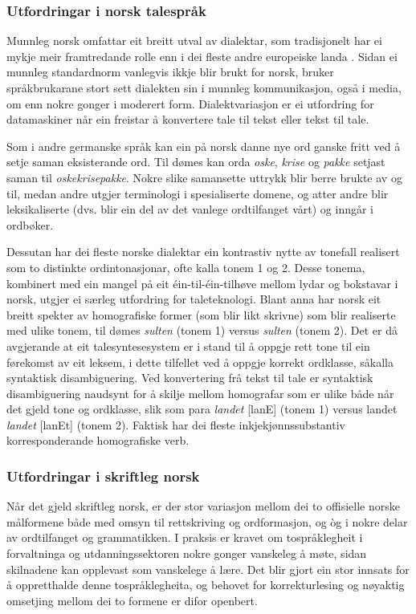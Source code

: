 \begin{multicols}{2}
\subsubsection{Utfordringar i norsk talespråk}
Munnleg norsk omfattar eit breitt utval av dialektar, som tradisjonelt har ei mykje meir framtredande rolle enn i dei fleste andre europeiske landa \cite{stm35:2008}.
Sidan ei munnleg standardnorm vanlegvis ikkje blir brukt for norsk, bruker språkbrukarane stort sett dialekten sin i munnleg kommunikasjon, også i media, om enn nokre gonger i moderert form. 
Dialektvariasjon er ei utfordring for datamaskiner når ein freistar å konvertere tale til tekst eller tekst til tale.

Som i andre germanske språk kan ein på norsk danne nye ord ganske fritt ved å setje saman eksisterande ord. Til dømes kan orda \textit{oske}, \textit{krise} og \textit{pakke} setjast saman til \textit{oskekrisepakke}.
Nokre slike samansette uttrykk blir berre brukte av og til, medan andre utgjer terminologi i spesialiserte domene, og atter andre blir leksikaliserte (dvs. blir ein del av det vanlege ordtilfanget vårt) og inngår i ordbøker. 

Dessutan har dei fleste norske dialektar ein kontrastiv nytte av tonefall realisert som to distinkte ordintonasjonar, ofte kalla tonem 1 og 2. Desse tonema, kombinert med ein mangel på eit éin-til-éin-tilhøve mellom lydar og bokstavar i norsk, utgjer ei særleg utfordring for taleteknologi. Blant anna har norsk eit breitt spekter av homografiske former (som blir likt skrivne) som blir realiserte med ulike tonem, til dømes  \textit{sulten} (tonem 1) versus \textit{sulten} (tonem 2). Det er då avgjerande at eit talesyntesesystem er i stand til å oppgje rett tone til ein førekomst av eit leksem, i dette tilfellet ved å oppgje korrekt ordklasse, såkalla syntaktisk disambiguering. 
Ved konvertering frå tekst til tale er syntaktisk disambiguering naudsynt for å skilje mellom homografar som er ulike både når det gjeld tone og ordklasse, slik som para  \textit{landet} {[}lanE{]} (tonem 1) versus landet \textit{landet} {[}lanEt{]} (tonem 2). 
Faktisk har dei fleste inkjekjønnssubstantiv korresponderande homografiske verb. 

\subsubsection{Utfordringar i skriftleg norsk}

Når det gjeld skriftleg norsk, er der stor variasjon mellom dei to offisielle norske målformene både med omsyn til rettskriving og ordformasjon, og òg i nokre delar av ordtilfanget og grammatikken. 
I praksis er kravet om tospråklegheit i forvaltninga og utdanningssektoren nokre gonger vanskeleg å møte, sidan skilnadene kan opplevast som vanskelege å lære. Det blir gjort ein stor innsats for å oppretthalde denne tospråklegheita, og behovet for korrekturlesing og nøyaktig omsetjing mellom dei to formene er difor openbert. 


\end{multicols}
